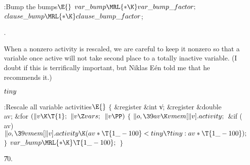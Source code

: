 \B{}:Bump the bumps\X${}\E{}$\6
$\\{var\_bump}\MRL{*{\K}}\\{var\_bump\_factor};{}$\6
${}\\{clause\_bump}\MRL{*{\K}}\\{clause\_bump\_factor}{}$;\par
{}.\fi

When a nonzero activity is rescaled, we are careful to keep
it nonzero
so that a variable once active will not take second place to a totally
inactive variable. (I doubt if this is terrifically important, but
Niklas E\'en told me that he recommends it.)

\Y\B\4\D$\\{tiny}$ \5
\par
\Y\B\4:Rescale all variable activities\X${}\E{}$\6
${}\{{}$\1\6
\&{register} \&{int} \|v;\6
\&{register} \&{double} \\{av};\7
\&{for} ${}(\|v\K\T{1};{}$ ${}\|v\Z\\{vars};{}$ ${}\|v\PP){}$\5
${}\{{}$\1\6
${}\|o,\39\\{av}\K\\{vmem}[\|v].\\{activity};{}$\6
\&{if} (\\{av})\1\5
${}\|o,\39\\{vmem}[\|v].\\{activity}\K(\\{av}*\T{1\_-100}<\\{tiny}\?\\{tiny}:%
\\{av}*\T{1\_-100});{}$\2\6
\4${}\}{}$\2\6
${}\\{var\_bump}\MRL{*{\K}}\T{1\_-100};{}$\6
\4${}\}{}$\2\par
\U70.\fi

